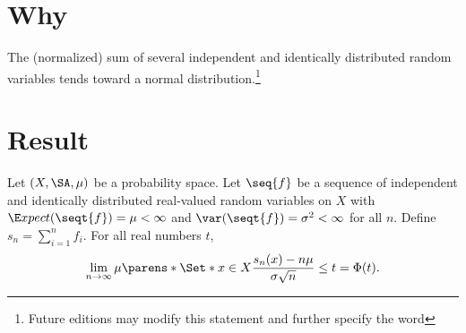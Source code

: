 

\section*{Why}

The (normalized) sum of several independent and identically distributed random variables tends toward a normal distribution.\footnote{Future editions may modify this statement and further specify the word }

\section*{Result}

\begin{proposition}
Let $(X, \SA, \mu )$
be a probability space.
Let $\seq{f}$ be a sequence
of independent and identically
distributed real-valued
random variables on $X$
with
$\E xpect(\seqt{f}) = \mu  < \infty$
and
$\var(\seqt{f}) = \sigma ^2 < \infty$
for all $n$.
Define $s_n = \sum_{i = 1}^{n}f_i$.
For all real numbers $t$,
  \[
\lim_{n \to \infty} \mu \parens*{\Set*{ x \in X }{ \frac{ s_n(x) - n\mu  }{ \sigma \sqrt{n} } \leq t }} = \Phi (t).
  \]\end{proposition}
\blankpage